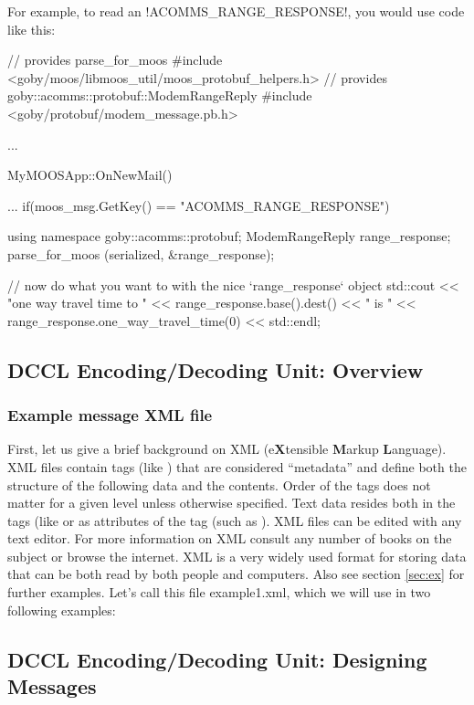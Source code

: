 For example, to read an !ACOMMS_RANGE_RESPONSE!, you would use code like this:
\begin{boxedverbatim}
// provides parse_for_moos
#include <goby/moos/libmoos_util/moos_protobuf_helpers.h>
// provides goby::acomms::protobuf::ModemRangeReply
#include <goby/protobuf/modem_message.pb.h>

...

MyMOOSApp::OnNewMail()
{
  ...
  if(moos_msg.GetKey() == "ACOMMS_RANGE_RESPONSE")
  {
    using namespace goby::acomms::protobuf;
    ModemRangeReply range_response;
    parse_for_moos (serialized, &range_response);
    
    // now do what you want to with the nice `range_response` object
    std::cout << "one way travel time to " << range_response.base().dest() 
              << " is " << range_response.one_way_travel_time(0) << std::endl;
  }
}
\end{boxedverbatim}
\resetbvlinenumber


\subsection{DCCL Encoding/Decoding Unit: Overview} \label{sec:dccl_overview}

\subsubsection{Example message XML file} \label{sec:ex_xml}

 First, let us give a brief background on XML (e\textbf{X}tensible \textbf{M}arkup
 \textbf{L}anguage). XML files contain tags (like
 ) that are considered ``metadata'' and define both
 the structure of the following data and the contents. Order of the
 tags does not matter for a given level unless otherwise
 specified. Text data resides both in the tags (like
  or as attributes of the tag (such as
 ). XML files can be edited with any
 text editor. For more information on XML consult any number of books
 on the subject or browse the internet. XML is a very widely used
 format for storing data that can be both read by both people and
 computers. Also see section \ref{sec:ex} for further examples. Let's call this file example1.xml, which we will use in two following examples:

\resetbvlinenumber

\subsection{DCCL Encoding/Decoding Unit: Designing Messages}

